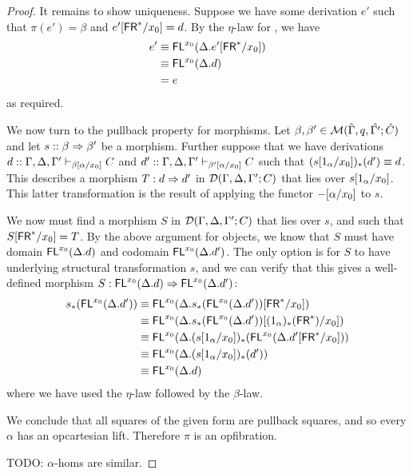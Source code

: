 \begin{proof}
It remains to show uniqueness. Suppose we have some derivation $e'$ such that $\pi(e') = \beta$ and $e'[\mathsf{FR}^*/x_0] = d$. By the $\eta$-law for , we have
\begin{align*}
e' &\equiv \mathsf{FL}^{x_0}(\Delta.e'[\mathsf{FR}^*/x_0])\\
&\equiv \mathsf{FL}^{x_0}(\Delta.d)\\
&= e
\end{align*}
as required.

We now turn to the pullback property for morphisms. Let $\beta, \beta' \in \mathcal{M}(\hat{\Gamma}, q, \hat{\Gamma'}; \hat{C})$ and let $s :: \beta \Rightarrow \beta'$ be a morphism. Further suppose that we have derivations $d :: \Gamma, \Delta, \Gamma' \vdash_{\beta[\alpha/x_0]} C$ and $d' :: \Gamma, \Delta, \Gamma' \vdash_{\beta'[\alpha/x_0]} C$ such that $(s[1_\alpha/x_0])_*(d') \equiv d$. This describes a morphism $T : d \Rightarrow d'$ in $\mathcal{D}(\Gamma,\Delta,\Gamma';C)$ that lies over $s[1_\alpha/x_0]$. This latter transformation is the result of applying the functor $-[\alpha/x_0]$ to $s$.

We now must find a morphism $S$ in $\mathcal{D}(\Gamma,\Delta,\Gamma';C)$ that lies over $s$, and such that $S[\mathsf{FR}^*/x_0] = T$. By the above argument for objects, we know that $S$ must have domain $\mathsf{FL}^{x_0}(\Delta.d)$ and codomain $\mathsf{FL}^{x_0}(\Delta.d')$. The only option is for $S$ to have underlying structural transformation $s$, and we can verify that this gives a well-defined morphism $S : \mathsf{FL}^{x_0}(\Delta.d) \Rightarrow \mathsf{FL}^{x_0}(\Delta.d')$:
\begin{align*}
s_*( \mathsf{FL}^{x_0}(\Delta.d')) &\equiv \mathsf{FL}^{x_0}(\Delta.s_*( \mathsf{FL}^{x_0}(\Delta.d'))[\mathsf{FR}^*/x_0])\\
&\equiv \mathsf{FL}^{x_0}(\Delta.s_*( \mathsf{FL}^{x_0}(\Delta.d'))[(1_\alpha)_*(\mathsf{FR}^*)/x_0])\\
&\equiv \mathsf{FL}^{x_0}(\Delta.(s[1_\alpha/x_0])_*( \mathsf{FL}^{x_0}(\Delta.d'[\mathsf{FR}^*/x_0]))\\
&\equiv \mathsf{FL}^{x_0}(\Delta.(s[1_\alpha/x_0])_*(d') )\\
&\equiv \mathsf{FL}^{x_0}(\Delta.d)
\end{align*}
where we have used the $\eta$-law followed by the $\beta$-law. 

We conclude that all squares of the given form are pullback squares, and so every $\alpha$ has an opcartesian lift. Therefore $\pi$ is an opfibration.

TODO: $\alpha$-homs are similar.
\end{proof}

